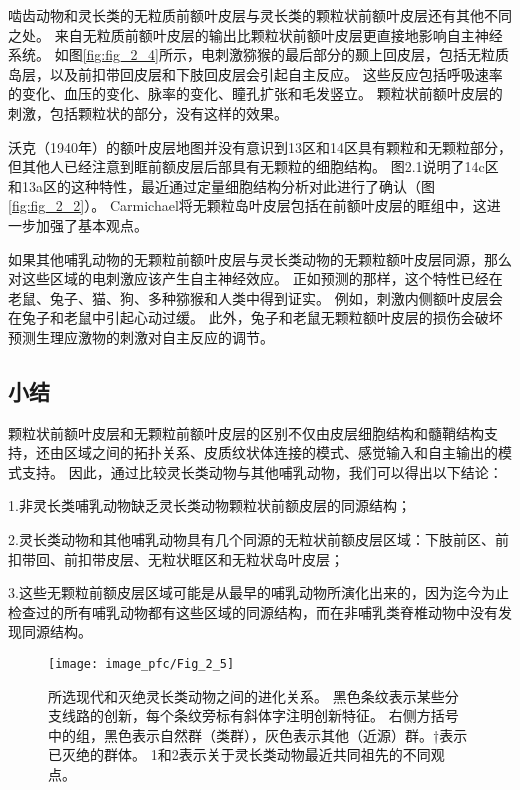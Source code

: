 啮齿动物和灵长类的无粒质前额叶皮层与灵长类的颗粒状前额叶皮层还有其他不同之处。
来自无粒质前额叶皮层的输出比颗粒状前额叶皮层更直接地影响自主神经系统。
如图\ref{fig:fig_2_4}所示，电刺激猕猴的最后部分的颞上回皮层，包括无粒质岛层，以及前扣带回皮层和下肢回皮层会引起自主反应\cite{kaada1960cingulate}。
这些反应包括呼吸速率的变化、血压的变化、脉率的变化、瞳孔扩张和毛发竖立。
颗粒状前额叶皮层的刺激，包括颗粒状的部分，没有这样的效果\cite{kaada1949respiratory}。


沃克（1940年）的额叶皮层地图并没有意识到13区和14区具有颗粒和无颗粒部分，但其他人已经注意到眶前额皮层后部具有无颗粒的细胞结构\cite{carmichael1994architectonic}。
图2.1说明了14c区和13a区的这种特性\cite{mackey2010quantitative}，最近通过定量细胞结构分析对此进行了确认（图\ref{fig:fig_2_2}）。
Carmichael\cite{carmichael1994architectonic}将无颗粒岛叶皮层包括在前额叶皮层的眶组中，这进一步加强了基本观点。


如果其他哺乳动物的无颗粒前额叶皮层与灵长类动物的无颗粒额叶皮层同源，那么对这些区域的电刺激应该产生自主神经效应。
正如预测的那样，这个特性已经在老鼠、兔子、猫、狗、多种猕猴和人类中得到证实。
例如，刺激内侧额叶皮层会在兔子\cite{powell2005single}和老鼠\cite{scopinho2009medial}中引起心动过缓。
此外，兔子\cite{powell1997amygdala}和老鼠\cite{frysztak1994effect}无颗粒额叶皮层的损伤会破坏预测生理应激物的刺激对自主反应的调节。


\subsection{小结}

颗粒状前额叶皮层和无颗粒前额叶皮层的区别不仅由皮层细胞结构和髓鞘结构支持，还由区域之间的拓扑关系、皮质纹状体连接的模式、感觉输入和自主输出的模式支持。
因此，通过比较灵长类动物与其他哺乳动物，我们可以得出以下结论：\par

1.非灵长类哺乳动物缺乏灵长类动物颗粒状前额皮层的同源结构；\par

2.灵长类动物和其他哺乳动物具有几个同源的无粒状前额皮层区域：下肢前区、前扣带回、前扣带皮层、无粒状眶区和无粒状岛叶皮层；\par

3.这些无颗粒前额皮层区域可能是从最早的哺乳动物所演化出来的，因为迄今为止检查过的所有哺乳动物都有这些区域的同源结构，而在非哺乳类脊椎动物中没有发现同源结构。


\begin{figure}[!htb]
	\centering
	\texttt{[image: image\_pfc/Fig\_2\_5]}
	\caption{所选现代和灭绝灵长类动物之间的进化关系。
		黑色条纹表示某些分支线路的创新，每个条纹旁标有斜体字注明创新特征。
		右侧方括号中的组，黑色表示自然群（类群），灰色表示其他（近源）群。†表示已灭绝的群体。
		1和2表示关于灵长类动物最近共同祖先的不同观点。\label{fig:fig_2_5}}
\end{figure}

